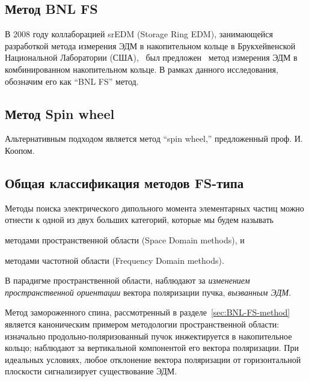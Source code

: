 \newcommand{\wimp}{\w_{\avg{E_v}}}
\newcommand{\wsw}{\w_{SW}}
\newcommand{\wedm}{\w_{edm}}

\newcommand{\D}{\Delta}

\subsection{Метод BNL FS \label{sec:BNL-FS-method}}
В 2008 году коллаборацией srEDM (Storage Ring EDM), занимающейся разработкой
метода измерения ЭДМ в накопительном кольце в Брукхейвенской
Национальной Лаборатории (США),~\cite{BNL:SREDM} был предложен~\cite{BNL:Deuteron2008} метод
измерения ЭДМ в комбинированном накопительном кольце. В рамках данного исследования, 
обозначим его как ``BNL FS'' метод. 



\subsection{Метод Spin wheel}
Альтернативным подходом является метод ``spin wheel,'' предложенный проф. И. Коопом.~\cite{Koop:SpinWheel2015}


\subsection{Общая классификация методов FS-типа}
Методы поиска электрического дипольного момента элементарных частиц можно отнести к одной из 
двух больших категорий, которые мы будем называть 
\begin{enumerate*}
	\item методами пространственной области (Space Domain methods), и
	\item методами частотной области (Frequency Domain methods).
\end{enumerate*}

В парадигме пространственной области, наблюдают за \emph{изменением пространственной
ориентации} вектора поляризации пучка, \emph{вызванным ЭДМ}. 

Метод замороженного спина, рассмотренный в разделе~\ref{sec:BNL-FS-method}  является
каноническим примером методологии пространственной области: изначально
продольно-поляризованный пучок инжектируется в накопительное кольцо; наблюдают за 
вертикальной компонентой его вектора поляризации. При идеальных условиях, любое отклонение
вектора поляризации от горизонтальной плоскости сигнализирует существование ЭДМ.

